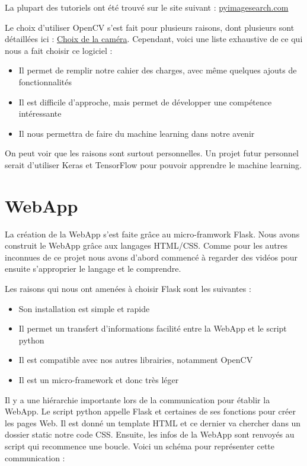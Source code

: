 \documentclass[
	a4paper,									%
	11pt,										%
	twoside,									%
	openright,									%
	notitlepage,									%
	parskip=half,								%
]{scrreprt}										%
\begin{document}
La plupart des tutoriels ont été trouvé sur le site suivant : \href{https://pyimagesearch.com/}{pyimagesearch.com} \par

Le choix d'utiliser OpenCV s'est fait pour plusieurs raisons, dont plusieurs sont détaillées ici : \href{run:./Choix_Camera.pdf}{Choix de la caméra}. 
Cependant, voici une liste exhaustive de ce qui nous a fait choisir ce logiciel :

\begin{itemize}
	\item Il permet de remplir notre cahier des charges, avec même quelques ajouts de fonctionnalités
	\item Il est difficile d'approche, mais permet de développer une compétence intéressante
	\item Il nous permettra de faire du machine learning dans notre avenir
\end{itemize}

On peut voir que les raisons sont surtout personnelles. Un projet futur personnel serait d'utiliser Keras et TensorFlow
pour pouvoir apprendre le machine learning. \par

\section{WebApp}

La création de la WebApp s'est faite grâce au micro-framwork Flask. Nous avons construit le WebApp grâce aux langages 
HTML/CSS. Comme pour les autres inconnues de ce projet nous avons d'abord commencé à regarder des vidéos pour ensuite
s'approprier le langage et le comprendre. \par

Les raisons qui nous ont amenées à choisir Flask sont les suivantes : 

\begin{itemize}
	\item Son installation est simple et rapide 
	\item Il permet un transfert d'informations facilité entre la WebApp et le script python
	\item Il est compatible avec nos autres librairies, notamment OpenCV
	\item Il est un micro-framework et donc très léger
\end{itemize}

Il y a une hiérarchie importante lors de la communication pour établir la WebApp. Le script python appelle Flask et certaines 
de ses fonctions pour créer les pages Web. Il est donné un template HTML et ce dernier va chercher dans un dossier static 
notre code CSS. Ensuite, les infos de la WebApp sont renvoyés au script qui recommence une boucle. 
Voici un schéma pour représenter cette communication : 
\end{document}
